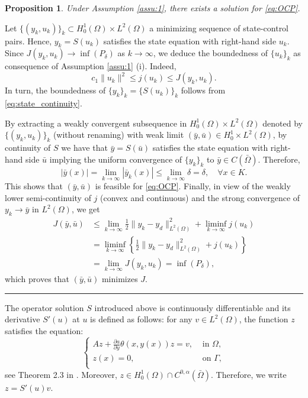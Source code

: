 \documentclass[11pt,a4paper]{amsart}
\newcommand{\arrow}{\rightarrow}
\newcommand{\kw}{\rule{2mm}{2mm}}
\renewcommand{\l}{\left}
\renewcommand{\r}{\right}
\newcommand{\om}{\Omega}
\newcommand{\ga}{\Gamma}
\renewenvironment{proof}{{Proof.}}{\hfill\kw}
\newtheorem{proposition}{{Proposition}}
\begin{document}
\begin{proposition}
Under Assumption \ref{assu:1},  there exists a solution for \eqref{eq:OCP}.
\end{proposition}
\begin{proof}
    Let $\{(y_k,u_k)\}_k \subset H_0^1(\om)\times L^2(\om) $ a minimizing sequence of state-control pairs. Hence, $y_k=S(u_k)$ satisfies the state equation with right-hand side $u_k$. Since $J(y_k,u_k) \arrow \inf (P_\delta) $ as $k\to\infty$, we deduce the boundedness of $\{u_k\}_k$  as consequence of Assumption \ref{assu:1} (i). Indeed,
    $$ c_1 \|u_k\|^2  \leq j(u_k) \leq J(y_k,u_k).$$
In turn, the boundedness of $\{y_k\}_k =\{S(u_k)\}_k$ follows from \eqref{eq:state_continuity}.

By extracting a weakly convergent subsequence in $H_0^1(\om) \times L^2(\om)$ denoted by $\{(y_k,u_k)\}_k$ (without renaming)  with weak limit $(\bar y, \bar u) \in H_0^1 \times L^2(\om)$,  by continuity of $S$ we have that $\bar y = S(\bar u)$ satisfies the state equation with right-hand side $\bar u$ implying the uniform convergence of $\{y_k\}_k$  to $\bar y \in C(\bar \om)$. Therefore,
$$|\bar y(x)| = \lim_{k\to \infty} |\bar y_k(x)| \leq \lim_{k\to \infty} \delta =\delta, \quad \forall x \in K.$$
This shows that $(\bar y, \bar u)$ is feasible for \eqref{eq:OCP}.
Finally, in view of the weakly lower semi-continuity of $j$ (convex and continuous) and the strong convergence of $y_k \to \bar y$ in $L^2(\om)$, we get
%
\begin{align*}
J(\bar y,\bar u) &\leq  \lim_{k\to \infty} \frac{1}{2} \|y_k -y_d\|^2_{L^2(\om)} + \liminf_{k\to \infty} j(u_k) \\ 
&= \liminf_{k\to \infty} \l\{ \frac{1}{2} \|y_k -y_d\|^2_{L^2(\om)} + j(u_k) \r\}\\
&=  \lim_{k\to \infty} J(y_k,u_k) = \inf(P_\delta),
\end{align*}
which proves that $(\bar y, \bar u)$ minimizes $J$.
\end{proof}

The operator solution $S$ introduced above is continuously differentiable and its derivative $S'(u)$ at $u$ is defined as follows: for any $v\in L^2(\om)$, the function $z$ satisfies the equation:
\begin{equation}\label{eq:derivate_s}
    \begin{cases}
        Az + \frac{\partial a}{\partial y}\theta(x,y(x))z = v,  & \text{ in } \om,\\
         z(x) =0, & \text{ on } \ga, \\
    \end{cases}
\end{equation}
see Theorem 2.3 in \cite{casas-trol}. Moreover, $z\in H_0^1(\om)\cap C^{0,\alpha}(\bar\om)$. Therefore, we write $z=S'(u)v$. 
\end{document}
